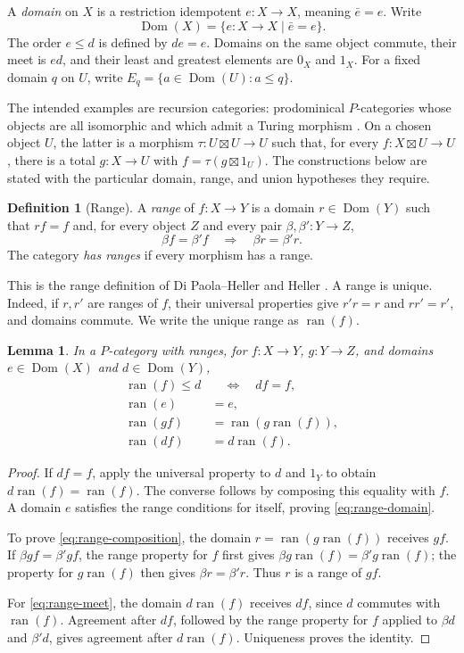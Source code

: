 \documentclass[11pt]{article}
\newtheorem{lemma}[theorem]{Lemma}
\theoremstyle{definition}
\newtheorem{definition}[theorem]{Definition}
\newcommand{\ran}{\operatorname{ran}}
\begin{document}
A \emph{domain} on $X$ is a restriction idempotent $e:X\to X$, meaning
$\bar e=e$. Write
\[
 \operatorname{Dom}(X)=\{e:X\to X\mid\bar e=e\}.
\]
The order $e\le d$ is defined by $de=e$. Domains on the same object commute,
their meet is $ed$, and their least and greatest elements are $0_X$ and $1_X$.
For a fixed domain $q$ on $U$, write
$E_q=\{a\in\operatorname{Dom}(U):a\le q\}$.

The intended examples are recursion categories: prodominical $P$-categories
whose objects are all isomorphic and which admit a Turing morphism
\cite{DPH,Heller}. On a chosen object $U$, the latter is a morphism
$\tau:U\boxtimes U\to U$ such that, for every $f:X\boxtimes U\to U$,
there is a total $g:X\to U$ with $f=\tau(g\boxtimes1_U)$.
The constructions below are stated with the particular domain, range, and
union hypotheses they require.

\begin{definition}[Range]\label{def:range}
A \emph{range} of $f:X\to Y$ is a domain $r\in\operatorname{Dom}(Y)$ such that $rf=f$ and,
for every object $Z$ and every pair $\beta,\beta':Y\to Z$,
\[
 \beta f=\beta'f\quad\Longrightarrow\quad\beta r=\beta'r.
\]
The category \emph{has ranges} if every morphism has a range.
\end{definition}

This is the range definition of Di Paola--Heller \cite[Definition 5.1]{DPH}
and Heller \cite{Heller}. A range is unique. Indeed, if $r,r'$ are ranges of
$f$, their universal properties give $r'r=r$ and $rr'=r'$, and domains
commute. We write the unique range as $\ran(f)$.

\begin{lemma}\label{lem:range}
In a $P$-category with ranges, for $f:X\to Y$, $g:Y\to Z$, and domains
$e\in\operatorname{Dom}(X)$ and $d\in\operatorname{Dom}(Y)$,
\begin{align}
 \ran(f)\le d&\quad\Longleftrightarrow\quad df=f,\label{eq:least-range}\\
 \ran(e)&=e,\label{eq:range-domain}\\
 \ran(gf)&=\ran(g\ran(f)),\label{eq:range-composition}\\
 \ran(df)&=d\ran(f).\label{eq:range-meet}
\end{align}
\end{lemma}
\begin{proof}
If $df=f$, apply the universal property to $d$ and $1_Y$ to obtain
$d\ran(f)=\ran(f)$. The converse follows by composing this equality with
$f$. A domain $e$ satisfies the range conditions for itself, proving
\eqref{eq:range-domain}.

To prove \eqref{eq:range-composition}, the domain $r=\ran(g\ran(f))$
receives $gf$. If $\beta gf=\beta'gf$, the range property for $f$ first gives
$\beta g\ran(f)=\beta'g\ran(f)$; the property for $g\ran(f)$ then gives
$\beta r=\beta'r$. Thus $r$ is a range of $gf$.

For \eqref{eq:range-meet}, the domain $d\ran(f)$ receives $df$, since $d$
commutes with $\ran(f)$. Agreement after $df$, followed by the range
property for $f$ applied to $\beta d$ and $\beta'd$, gives agreement after
$d\ran(f)$. Uniqueness proves the identity.
\end{proof}
\end{document}
